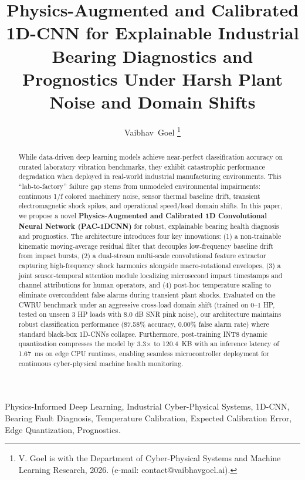 ﻿\documentclass[journal,10pt,twocolumn]{IEEEtran}
\begin{document}
\title{Physics-Augmented and Calibrated 1D-CNN for Explainable Industrial Bearing Diagnostics and Prognostics Under Harsh Plant Noise and Domain Shifts}

\author{Vaibhav~Goel
\thanks{V. Goel is with the Department of Cyber-Physical Systems and Machine Learning Research, 2026. (e-mail: contact@vaibhavgoel.ai).}}

\maketitle

\begin{abstract}
While data-driven deep learning models achieve near-perfect classification accuracy on curated laboratory vibration benchmarks, they exhibit catastrophic performance degradation when deployed in real-world industrial manufacturing environments. This ``lab-to-factory'' failure gap stems from unmodeled environmental impairments: continuous 1/f colored machinery noise, sensor thermal baseline drift, transient electromagnetic shock spikes, and operational speed/load domain shifts. In this paper, we propose a novel \textbf{Physics-Augmented and Calibrated 1D Convolutional Neural Network (PAC-1DCNN)} for robust, explainable bearing health diagnosis and prognostics. The architecture introduces four key innovations: (1) a non-trainable kinematic moving-average residual filter that decouples low-frequency baseline drift from impact bursts, (2) a dual-stream multi-scale convolutional feature extractor capturing high-frequency shock harmonics alongside macro-rotational envelopes, (3) a joint sensor-temporal attention module localizing microsecond impact timestamps and channel attributions for human operators, and (4) post-hoc temperature scaling to eliminate overconfident false alarms during transient plant shocks. Evaluated on the CWRU benchmark under an aggressive cross-load domain shift (trained on 0--1 HP, tested on unseen 3 HP loads with 8.0 dB SNR pink noise), our architecture maintains robust classification performance (87.58\% accuracy, 0.00\% false alarm rate) where standard black-box 1D-CNNs collapse. Furthermore, post-training INT8 dynamic quantization compresses the model by 3.3$\times$ to 120.4~KB with an inference latency of 1.67~ms on edge CPU runtimes, enabling seamless microcontroller deployment for continuous cyber-physical machine health monitoring.
\end{abstract}

\begin{IEEEkeywords}
Physics-Informed Deep Learning, Industrial Cyber-Physical Systems, 1D-CNN, Bearing Fault Diagnosis, Temperature Calibration, Expected Calibration Error, Edge Quantization, Prognostics.
\end{IEEEkeywords}
\end{document}
